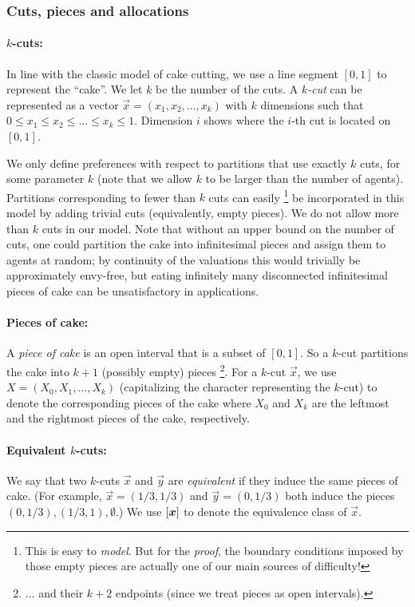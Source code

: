 

\subsubsection*{Cuts, pieces and allocations}
\paragraph{$k$-cuts:} In line with the classic model of cake cutting, we use a line segment $[0, 1]$ to represent the ``cake''. We let $k$ be the number of the cuts. A {\em $k$-cut} can be represented as a vector $\vec{x} = (x_1, x_2, \ldots, x_k)$ with $k$ dimensions such that $0 \leq x_1 \leq x_2 \leq \ldots \leq x_k \leq 1$. Dimension $i$ shows where the $i$-th cut is located on $[0, 1]$. 

We only define preferences with respect to partitions that use exactly $k$ cuts, for some parameter $k$ (note that we allow $k$ to be larger than the number of agents). Partitions corresponding to fewer than $k$ cuts can easily%
\footnote{This is easy to {\em model}. But for the {\em proof}, the boundary conditions imposed by those empty pieces are actually one of our main sources of difficulty!} 
be incorporated in this model by adding trivial cuts (equivalently, empty pieces).  
We do not allow more than $k$ cuts in our model. Note that without an upper bound on the number of cuts, one could partition the cake into infinitesimal pieces and assign them to agents at random; by continuity of the valuations this would trivially be approximately envy-free, but eating infinitely many disconnected infinitesimal pieces of cake can be unsatisfactory in applications.

\paragraph{Pieces of cake:} A {\em piece of cake} is an open interval that is a subset of $[0, 1]$. So a $k$-cut partitions the cake into $k+1$ (possibly empty) pieces%
\footnote{... and their $k+2$ endpoints (since we treat pieces as open intervals).}. For a $k$-cut $\vec{x}$, we use $X = (X_0, X_1, \ldots, X_k)$ (capitalizing the character representing the $k$-cut) to denote the corresponding pieces of the cake where $X_0$ and $X_k$ are the leftmost and the rightmost pieces of the cake, respectively. 

\paragraph{Equivalent $k$-cuts:} We say that two $k$-cuts $\vec{x}$ and $\vec{y}$ are {\em equivalent} if they induce the same pieces of cake. (For example, $\vec{x} = (1/3,1/3)$ and $\vec{y} = (0,1/3)$ both induce the pieces $(0,1/3), (1/3,1), \emptyset$.) We use $[\boldsymbol{x}]$ to denote the equivalence class of $\vec{x}$.

